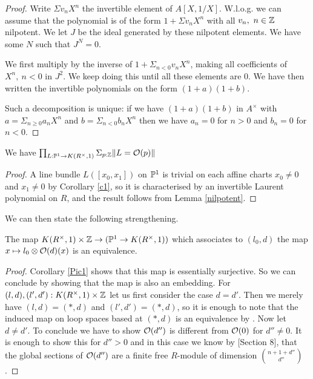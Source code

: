 \begin{proof}
  Write $\Sigma v_nX^n$ the invertible element of $A[X,1/X]$.
  W.l.o.g. we can assume that the polynomial is of the form $1 + \Sigma v_nX^n$ with
  all $v_n,~n\in \mathbb{Z}$ nilpotent.
  We let $J$ be the ideal generated by these nilpotent elements.
  We have some $N$ such that $J^N = 0$.
  
  We first multiply by the inverse of $1 + \Sigma_{n<0}v_nX^n$, making all coefficients of
  $X^n,~n<0$ in $J^2$.
  We keep doing this until all these elements are $0$.
  We have then written the invertible polynomials on the form $(1+a)(1+b)$.

  Such a decomposition is unique: if we have $(1+a)(1+b)$ in $A^{\times}$ with $a = \Sigma_{n\geqslant 0}a_nX^n$
  and $b = \Sigma_{n<0}b_nX^n$ then we have $a_n = 0$ for $n>0$ and $b_n = 0$ for $n<0$.
\end{proof}

\begin{corollary}\label{Pic1}
  We have $\prod_{L:\mathbb{P}^1\rightarrow K(R^{\times},1)}\Sigma_{p:\mathbb{Z}}\|L = \mathcal{O}(p)\|$
\end{corollary}

\begin{proof}
A line bundle $L([x_0,x_1])$ on $\mathbb{P}^1$ is trivial on each affine charts $x_0\neq 0$ and $x_1\neq 0$ by Corollary \ref{c1}, so
it is characterised by an invertible Laurent polynomial on $R$, and the result follows from Lemma \ref{nilpotent}.
\end{proof}

We can then state the following strengthening.

\begin{proposition}\label{Matthias}
  The map $K(R^{\times},1)\times\mathbb{Z}\rightarrow (\mathbb{P}^1\rightarrow K(R^{\times},1))$
  which associates to $(l_0,d)$ the map $x\mapsto l_0\otimes \mathcal{O}(d)(x)$ is an equivalence.
\end{proposition}

\begin{proof}
  Corollary \ref{Pic1} shows that this map is essentially surjective.
  So we can conclude by showing that the map is also an embedding.
  For $(l,d),(l',d'):K(R^{\times},1)\times\mathbb{Z}$ let us first consider the case $d=d'$. 
  Then we merely have $(l,d)=(\ast,d)$ and $(l',d')=(\ast,d)$,
  so it is enough to note that the induced map on loop spaces based at $(\ast,d)$ is an equivalence by .
  Now let $d\neq d'$. To conclude we have to show $\mathcal{O}(d'')$ is different from $\mathcal{O}(0)$ for $d''\neq 0$.
  It is enough to show this for $d''>0$ and in this case we know by \cite{cech-draft}[Section 8],
  that the global sections of $\mathcal{O}(d'')$ are a finite free $R$-module of dimension $n+1+d''\choose d''$.
\end{proof}

